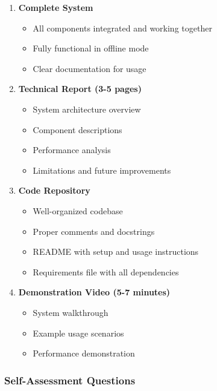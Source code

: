 \documentclass[
  screen,review,acmlarge]{acmart}
\providecommand{\tightlist}{%
  \setlength{\itemsep}{0pt}\setlength{\parskip}{0pt}}
\begin{document}
\begin{enumerate}
\def\labelenumi{\arabic{enumi}.}
\tightlist
\item
  \textbf{Complete System}

  \begin{itemize}
  \tightlist
  \item
    All components integrated and working together
  \item
    Fully functional in offline mode
  \item
    Clear documentation for usage
  \end{itemize}
\item
  \textbf{Technical Report (3-5 pages)}

  \begin{itemize}
  \tightlist
  \item
    System architecture overview
  \item
    Component descriptions
  \item
    Performance analysis
  \item
    Limitations and future improvements
  \end{itemize}
\item
  \textbf{Code Repository}

  \begin{itemize}
  \tightlist
  \item
    Well-organized codebase
  \item
    Proper comments and docstrings
  \item
    README with setup and usage instructions
  \item
    Requirements file with all dependencies
  \end{itemize}
\item
  \textbf{Demonstration Video (5-7 minutes)}

  \begin{itemize}
  \tightlist
  \item
    System walkthrough
  \item
    Example usage scenarios
  \item
    Performance demonstration
  \end{itemize}
\end{enumerate}

\subsubsection{Self-Assessment Questions}\label{self-assessment-questions}
\end{document}
